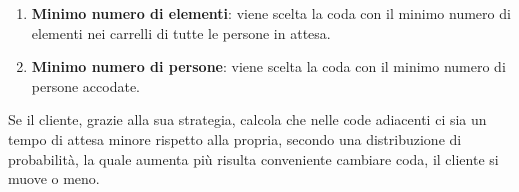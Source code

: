 \begin{enumerate}
\item \textbf{Minimo numero di elementi}: viene scelta la coda con il minimo numero di elementi nei carrelli di tutte le persone in attesa.
\item \textbf{Minimo numero di persone}: viene scelta la coda con il minimo numero di persone accodate.
\end{enumerate}

Se il cliente, grazie alla sua strategia, calcola che nelle code adiacenti ci sia un tempo di attesa minore rispetto alla propria, secondo una distribuzione di probabilità, la quale aumenta più risulta conveniente cambiare coda, il cliente si muove o meno. 